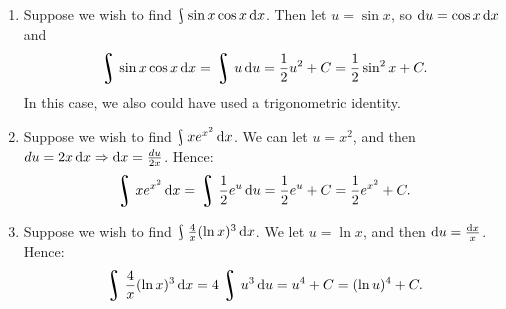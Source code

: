 \begin{exs}\leavevmode
  \begin{enumerate}
    \item Suppose we wish to find $ \rint \sin x \cos x \dif{x} $. Then let $ u = \sin x $, so $ \dif{u} = \cos x \dif{x} $
          and
          \begin{displaymath}
            \rint \sin x \cos x \dif{x} = \rint u \dif{u} = \frac{1}{2} u^2 + C = \frac{1}{2} \sin^2 x + C.
          \end{displaymath}
          In this case, we also could have used a trigonometric identity.
    \item Suppose we wish to find $ \rint xe^{x^2} \dif{x} $. We can let $ u = x^2 $, and then $ du = 2x \dif{x} \Rightarrow \dif{x} = \frac{du}{2x} $.
          Hence:
          \begin{displaymath}
            \rint xe^{x^2} \dif{x} = \rint \frac{1}{2} e^u \dif{u} = \frac{1}{2} e^u + C = \frac{1}{2}e^{x^2} + C.
          \end{displaymath}
    \item Suppose we wish to find $ \rint \frac{4}{x} (\ln x)^3 \dif{x} $. We let $ u = \ln x $, and then $ \dif{u} = \frac{\dif{x}}{x} $.
          Hence:
          \begin{displaymath}
            \rint \frac{4}{x} (\ln x)^3 \dif{x} = 4\rint u^3 \dif{u} = u^4 + C = (\ln u)^4 + C.
          \end{displaymath}
  \end{enumerate}
\end{exs}

